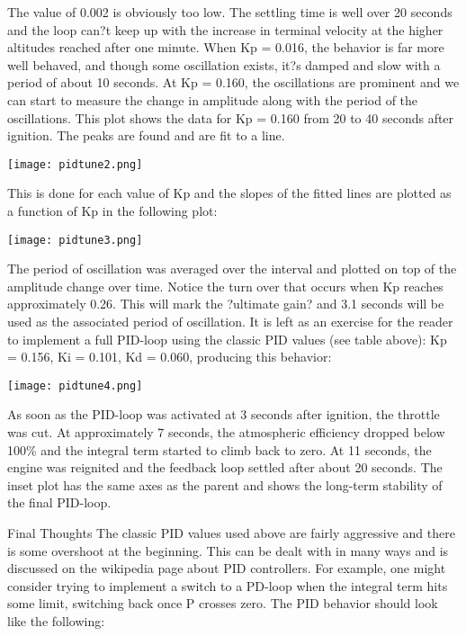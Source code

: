The value of 0.002 is obviously too low. The settling time is well over 20 seconds and the loop can?t keep up with the increase in terminal velocity at the higher altitudes reached after one minute. When Kp = 0.016, the behavior is far more well behaved, and though some oscillation exists, it?s damped and slow with a period of about 10 seconds. At Kp = 0.160, the oscillations are prominent and we can start to measure the change in amplitude along with the period of the oscillations. This plot shows the data for Kp = 0.160 from 20 to 40 seconds after ignition. The peaks are found and are fit to a line.

\begin{center}
\texttt{[image: pidtune2.png]}
\end{center}

This is done for each value of Kp and the slopes of the fitted lines are plotted as a function of Kp in the following plot:

\begin{center}
\texttt{[image: pidtune3.png]}
\end{center}

The period of oscillation was averaged over the interval and plotted on top of the amplitude change over time. Notice the turn over that occurs when Kp reaches approximately 0.26. This will mark the ?ultimate gain? and 3.1 seconds will be used as the associated period of oscillation. It is left as an exercise for the reader to implement a full PID-loop using the classic PID values (see table above): Kp = 0.156, Ki = 0.101, Kd = 0.060, producing this behavior:

\begin{center}
\texttt{[image: pidtune4.png]}
\end{center}

As soon as the PID-loop was activated at 3 seconds after ignition, the throttle was cut. At approximately 7 seconds, the atmospheric efficiency dropped below 100\% and the integral term started to climb back to zero. At 11 seconds, the engine was reignited and the feedback loop settled after about 20 seconds. The inset plot has the same axes as the parent and shows the long-term stability of the final PID-loop.

Final Thoughts
The classic PID values used above are fairly aggressive and there is some overshoot at the beginning. This can be dealt with in many ways and is discussed on the wikipedia page about PID controllers. For example, one might consider trying to implement a switch to a PD-loop when the integral term hits some limit, switching back once P crosses zero. The PID behavior should look like the following:

